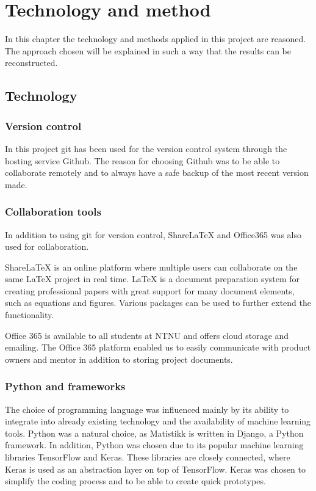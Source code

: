 \chapter{Technology and method}

In this chapter the technology and methods applied in this project are reasoned. The approach chosen will be explained in such a way that the results can be reconstructed.

\section{Technology}

\subsection{Version control}
In this project git has been used for the version control system through the hosting service Github. The reason for choosing Github was to be able to collaborate remotely and to always have a safe backup of the most recent version made.

\subsection{Collaboration tools}

In addition to using git for version control, ShareLaTeX and Office365 was also used for collaboration. 

ShareLaTeX is an online platform where multiple users can collaborate on the same LaTeX project in real time. LaTeX is a document preparation system for creating professional papers with great support for many document elements, such as equations and figures. Various packages can be used to further extend the functionality. 

Office 365 is available to all students at NTNU and offers cloud storage and emailing. The Office 365 platform enabled us to easily communicate with product owners and mentor in addition to storing project documents.


\subsection{Python and frameworks}
The choice of programming language was influenced mainly by its ability to integrate into already existing technology and the availability of machine learning tools. Python was a natural choice, as Matistikk is written in Django, a Python framework. In addition, Python was chosen due to its popular machine learning libraries TensorFlow and Keras. These libraries are closely connected, where Keras is used as an abstraction layer on top of TensorFlow. Keras was chosen to simplify the coding process and to be able to create quick prototypes.


